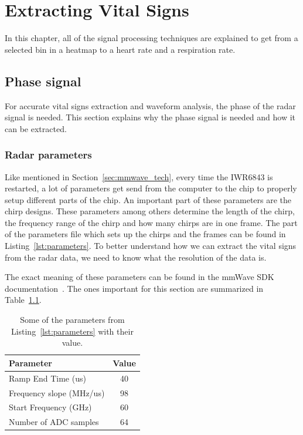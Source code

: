 \chapter{Extracting Vital Signs}
\label{chp:measuring_vital_signs}
In this chapter, all of the signal processing techniques are explained to get from a selected bin in a heatmap to a heart rate and a respiration rate.

\section{Phase signal}
For accurate vital signs extraction and waveform analysis, the phase of the radar signal is needed. This section explains why the phase signal is needed and how it can be extracted.

\subsection{Radar parameters}
\label{sec:radar_parameters}
Like mentioned in Section~\ref{sec:mmwave_tech}, every time the IWR6843 is restarted, a lot of parameters get send from the computer to the chip to properly setup different parts of the chip. An important part of these parameters are the chirp designs. These parameters among others determine the length of the chirp, the frequency range of the chirp and how many chirps are in one frame. The part of the parameters file which sets up the chirps and the frames can be found in Listing~\ref{lst:parameters}. To better understand how we can extract the vital signs from the radar data, we need to know what the resolution of the data is.

The exact meaning of these parameters can be found in the mmWave SDK documentation~\cite{mmwavesdk_website}. The ones important for this section are summarized in Table~\ref{tab:parameters}.

\begin{table}[t]
\centering
\begin{tabular}{|l|c|}
\hline
Parameter & Value \\ \hline
Ramp End Time (us) & 40 \\
Frequency slope (MHz/us) & 98 \\
Start Frequency (GHz) & 60 \\
Number of ADC samples & 64 \\ \hline
\end{tabular}
\caption{Some of the parameters from Listing~\ref{lst:parameters} with their value.}
\label{tab:parameters}
\end{table}

